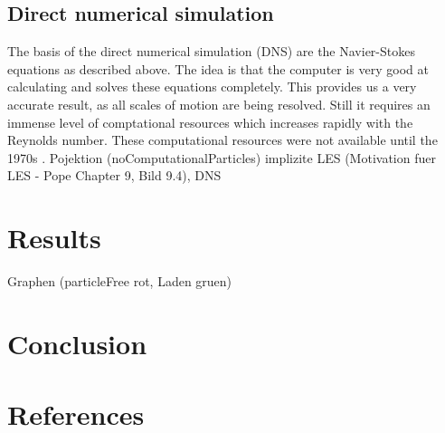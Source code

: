 \documentclass[a4paper,10pt]{article}
\numberwithin{equation}{section} %
\begin{document}
\subsection{Direct numerical simulation}
The basis of the direct numerical simulation (DNS) are the Navier-Stokes equations as described above. The idea is that the computer is very good at calculating and solves these equations completely. This provides us a very accurate result, as all scales of motion are being resolved. Still it requires an immense level of comptational resources which increases rapidly with the Reynolds number. These computational resources were not available until the 1970s \cite{turbulentFlows}.
\newline
\pagebreak
Pojektion (noComputationalParticles)
implizite LES (Motivation fuer LES -  Pope Chapter 9, Bild 9.4), DNS
\pagebreak
\section{Results}

Graphen (particleFree rot, Laden gruen)
\pagebreak
\section{Conclusion}
\pagebreak
\section{References}
\nocite{*} %
\pagebreak
\end{document}
